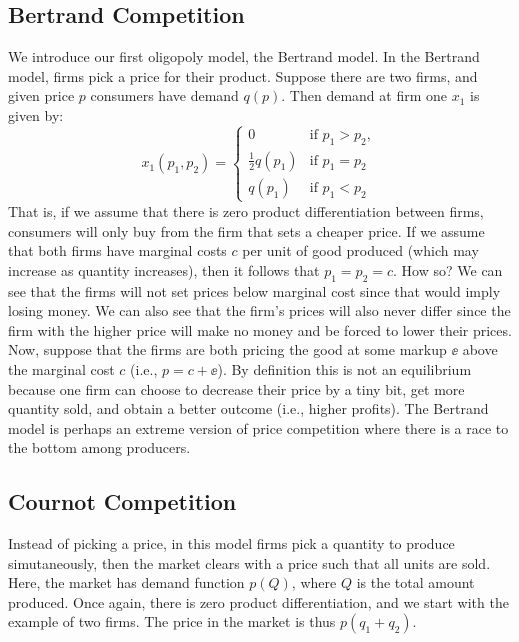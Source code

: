 \subsection*{Bertrand Competition}
We introduce our first oligopoly model, the Bertrand model. In the Bertrand model, firms pick a price for their product. Suppose there are two firms, and given price $p$ consumers have demand $q(p)$. Then demand at firm one $x_1$ is given by:
\begin{equation}
    x_1(p_1,p_2) = 
    \begin{cases}
    0 & \text{if } p_1 > p_2, \\
    \frac{1}{2}q(p_1) & \text{if } p_1 = p_2 \\
    q(p_1) & \text{if } p_1 < p_2
    \end{cases}
\end{equation}
That is, if we assume that there is zero product differentiation between firms, consumers will only buy from the firm that sets a cheaper price. If we assume that both firms have marginal costs $c$ per unit of good produced (which may increase as quantity increases), then it follows that $p_1 = p_2 = c$. How so? We can see that the firms will not set prices below marginal cost since that would imply losing money. We can also see that the firm's prices will also never differ since the firm with the higher price will make no money and be forced to lower their prices. Now, suppose that the firms are both pricing the good at some markup $\ee$ above the marginal cost $c$ (i.e., $p = c + \ee$). By definition this is not an equilibrium because one firm can choose to decrease their price by a tiny bit, get more quantity sold, and obtain a better outcome (i.e., higher profits). The Bertrand model is perhaps an extreme version of price competition where there is a race to the bottom among producers.

\subsection*{Cournot Competition}
Instead of picking a price, in this model firms pick a quantity to produce simutaneously, then the market clears with a price such that all units are sold. Here, the market has demand function $p(Q)$, where $Q$ is the total amount produced. Once again, there is zero product differentiation, and we start with the example of two firms. The price in the market is thus $p(q_1 + q_2)$.

